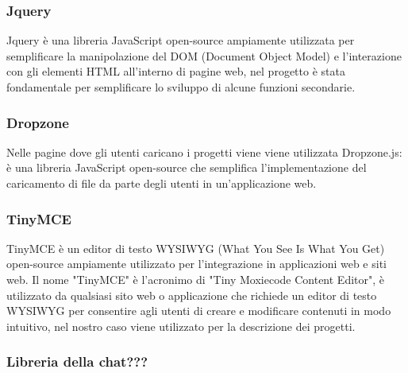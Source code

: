 \documentclass{article}
\begin{document}
\subsubsection{Jquery}
Jquery è una libreria JavaScript open-source ampiamente utilizzata per semplificare la manipolazione del DOM (Document Object Model) e l'interazione con gli elementi HTML all'interno di pagine web, nel progetto è stata fondamentale per semplificare lo sviluppo di alcune funzioni secondarie.
\subsubsection{Dropzone}
Nelle pagine dove gli utenti caricano i progetti viene viene utilizzata Dropzone.js: è una libreria JavaScript open-source che semplifica l'implementazione del caricamento di file da parte degli utenti in un'applicazione web.
\subsubsection{TinyMCE}
TinyMCE è un editor di testo WYSIWYG (What You See Is What You Get) open-source ampiamente utilizzato per l'integrazione in applicazioni web e siti web. Il nome "TinyMCE" è l'acronimo di "Tiny Moxiecode Content Editor", è utilizzato da qualsiasi sito web o applicazione che richiede un editor di testo WYSIWYG per consentire agli utenti di creare e modificare contenuti in modo intuitivo, nel nostro caso viene utilizzato per la descrizione dei progetti.
\subsubsection{Libreria della chat???}
\end{document}
